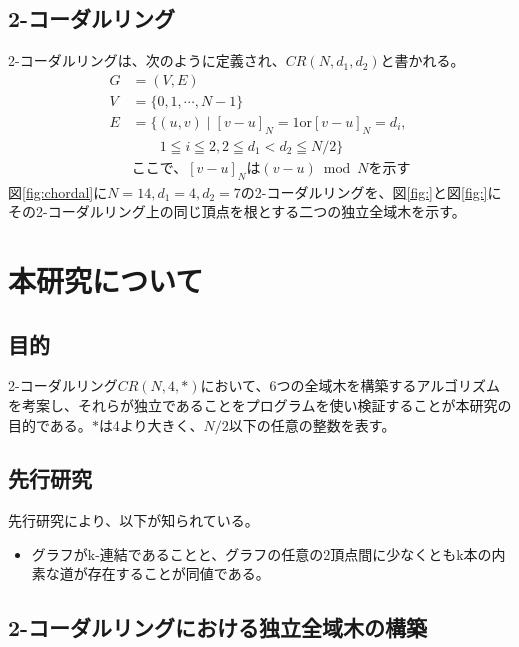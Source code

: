 \documentclass[dvipdfmx, twocolumn, 11pt]{jsarticle}
\begin{document}
    \subsection{2-コーダルリング}
        2-コーダルリングは、次のように定義され、$CR(N, d_1, d_2)$と書かれる。
        \begin{equation*}
            \begin{split}
                G &= (V, E) \\
                V &= \{0, 1, \cdots, N-1\} \\
                E &= \{(u, v) \mid [v-u]_N = 1 \text{or} [v-u]_N = d_i, \\
                  &\qquad 1 \leqq i \leqq 2, 2 \leqq d_1 < d_2 \leqq N/2\} \\
                  &\text{ここで、}[v-u]_N \text{は} (v-u) \bmod N \text{を示す}
            \end{split}
        \end{equation*}
        図\ref{fig:chordal}に$N = 14, d_1 = 4, d_2 = 7$の2-コーダルリングを、図\ref{fig:}と図\ref{fig:}にその2-コーダルリング上の同じ頂点を根とする二つの独立全域木を示す。
      

\section{本研究について}
    \subsection{目的}
        2-コーダルリング$CR(N, 4, *)$において、6つの全域木を構築するアルゴリズムを考案し、それらが独立であることをプログラムを使い検証することが本研究の目的である。$*$は4より大きく、$N/2$以下の任意の整数を表す。

    \subsection{先行研究}
        先行研究により、以下が知られている。
        \begin{itemize}
            \item グラフがk-連結であることと、グラフの任意の2頂点間に少なくともk本の内素な道が存在することが同値である。
        \end{itemize}

    \subsection{2-コーダルリングにおける独立全域木の構築}
    




\nocite{2006離散数学入門}
\nocite{chartrand1993applied}
\end{document}
